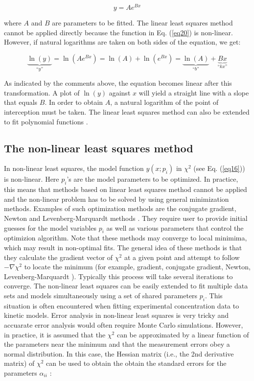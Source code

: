 \documentclass[byrevtex,amssymb,aps,pra,floatfix,letterpaper]{revtex4}
\begin{document}
\begin{equation}
\label{eq20}
y = Ae^{Bx}
\end{equation}

\noindent
where $A$ and $B$ are parameters to be fitted. The linear least squares method cannot be applied directly because the function in Eq. (\ref{eq20}) is non-linear. However, if natural logarithms are taken on both sides of the equation, we get:

\begin{equation}
\label{eq21}
\underbrace{\ln(y)}_\textit{``y''} = \ln(Ae^{Bx}) = \ln(A) + \ln(e^{Bx}) = \underbrace{\ln(A)}_\textit{``b''} + \underbrace{Bx}_\textit{``kx''}
\end{equation}

\noindent
As indicated by the comments above, the equation becomes linear after this transformation. A plot of $\ln(y)$ against $x$ will yield a straight line with a slope that equals $B$. In order to obtain $A$, a
natural logarithm of the point of interception must be taken. The linear least squares method can also be extended to fit polynomial functions \cite{NUMREP}.

\subsection{The non-linear least squares method}

In non-linear least squares, the model function $y(x; p_i)$ in $\chi^2$ (see Eq. (\ref{eq16})) is non-linear. Here $p_i$'s are the model parameters to be optimized. In practice, this means that methods based on linear least squares method cannot be applied and the non-linear problem has to be solved by using general minimization methods. Examples of such optimization methods are the conjugate gradient, Newton and Levenberg-Marquardt methods \cite{NUMREP}. They require user to provide initial guesses for the model variables $p_i$ as well as various parameters that control the optimizion algorithm. Note that these methods may converge to local minimima, which may result in non-optimal fits. The general idea of these methods is that they calculate the gradient vector of $\chi^2$ at a given point and attempt to follow $-\nabla\chi^2$ to locate the minimum (for example, gradient, conjugate gradient, Newton, Levenberg-Marquardt \cite{NUMREP}). Typically this process will take several iterations to converge. The non-linear least squares can be easily extended to fit multiple data sets and models simultaneously using a set of shared parameters $p_i$. This situation is often encountered when fitting experimental concentration data to kinetic models. Error analysis in non-linear least squares is very tricky and accuarate error analysis would often require Monte Carlo simulations. However, in practice, it is assumed that the $\chi^2$ can be approximated by a linear function of the parameters near the minimum and that the measurement errors obey a normal distribution. In this case, the Hessian matrix (i.e., the 2nd derivative matrix) of $\chi^2$ can be used to obtain the obtain the standard errors for the parameters $\alpha_{ii}$ \cite{NUMREP}:
\end{document}
